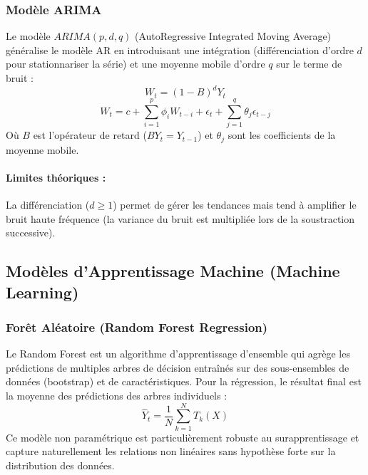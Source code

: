 \documentclass[11pt,a4paper]{article}
\begin{document}
\subsubsection{Modèle ARIMA}
Le modèle $ARIMA(p, d, q)$ (AutoRegressive Integrated Moving Average) généralise le modèle AR en introduisant une intégration (différenciation d'ordre $d$ pour stationnariser la série) et une moyenne mobile d'ordre $q$ sur le terme de bruit :
\begin{equation}
    W_t = (1-B)^d Y_t
\end{equation}
\begin{equation}
    W_t = c + \sum_{i=1}^{p} \phi_i W_{t-i} + \epsilon_t + \sum_{j=1}^{q} \theta_j \epsilon_{t-j}
\end{equation}
Où $B$ est l'opérateur de retard ($B Y_t = Y_{t-1}$) et $\theta_j$ sont les coefficients de la moyenne mobile. 
\paragraph{Limites théoriques :} La différenciation ($d \ge 1$) permet de gérer les tendances mais tend à amplifier le bruit haute fréquence (la variance du bruit est multipliée lors de la soustraction successive).

\subsection{Modèles d'Apprentissage Machine (Machine Learning)}
\subsubsection{Forêt Aléatoire (Random Forest Regression)}
Le Random Forest est un algorithme d'apprentissage d'ensemble qui agrège les prédictions de multiples arbres de décision entraînés sur des sous-ensembles de données (bootstrap) et de caractéristiques. Pour la régression, le résultat final est la moyenne des prédictions des arbres individuels :
\begin{equation}
    \hat{Y}_t = \frac{1}{N} \sum_{k=1}^{N} T_k(X)
\end{equation}
Ce modèle non paramétrique est particulièrement robuste au surapprentissage et capture naturellement les relations non linéaires sans hypothèse forte sur la distribution des données.
\end{document}
